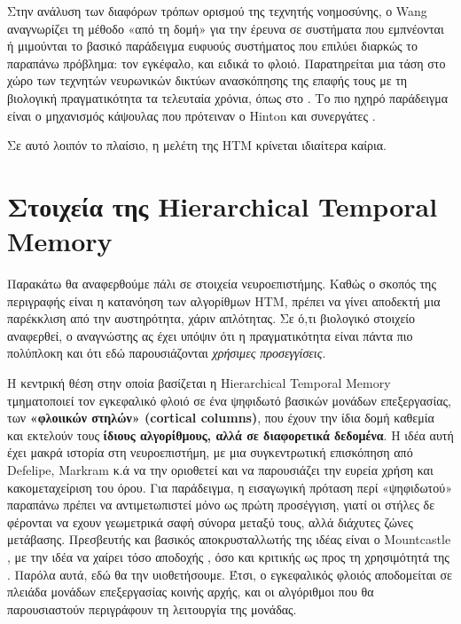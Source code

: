 	Στην ανάλυση των διαφόρων τρόπων ορισμού της τεχνητής νοημοσύνης, ο Wang \parencite{wangWhatYouMean2008} αναγνωρίζει τη μέθοδο
	«από τη δομή» για την έρευνα σε συστήματα που εμπνέονται ή μιμούνται
	το βασικό παράδειγμα ευφυούς συστήματος που επιλύει διαρκώς το παραπάνω πρόβλημα: τον εγκέφαλο, και ειδικά το φλοιό.
	Παρατηρείται μια τάση στο χώρο των τεχνητών νευρωνικών δικτύων ανασκόπησης της επαφής τους με τη βιολογική πραγματικότητα τα τελευταία χρόνια,
	όπως στο \cite{bengioBiologicallyPlausibleDeep2015}.
	Το πιο ηχηρό παράδειγμα είναι ο μηχανισμός κάψουλας που πρότειναν ο Hinton και συνεργάτες \parencite{sabourMatrixCapsulesEM2018,sabourDynamicRoutingCapsules2017}.
	\smallskip

	Σε αυτό λοιπόν το πλαίσιο, η μελέτη της HTM κρίνεται ιδιαίτερα καίρια.

\section{Στοιχεία της Hierarchical Temporal Memory}

	Παρακάτω θα αναφερθούμε πάλι σε στοιχεία νευροεπιστήμης.
	Καθώς ο σκοπός της περιγραφής είναι η κατανόηση των αλγορίθμων HTM, πρέπει να γίνει αποδεκτή μια παρέκκλιση από την αυστηρότητα, χάριν απλότητας.
	Σε ό,τι βιολογικό στοιχείο αναφερθεί, ο αναγνώστης ας έχει υπόψιν ότι η πραγματικότητα είναι πάντα πιο πολύπλοκη και ότι εδώ παρουσιάζονται \textit{χρήσιμες προσεγγίσεις}.

	Η κεντρική θέση στην οποία βασίζεται η Hierarchical Temporal Memory τμηματοποιεί τον εγκεφαλικό φλοιό σε ένα ψηφιδωτό βασικών μονάδων επεξεργασίας,
	των \textbf{«φλοιικών στηλών» (cortical columns)},
	που έχουν την ίδια δομή καθεμία και εκτελούν τους \textbf{ίδιους αλγορίθμους, αλλά σε διαφορετικά δεδομένα}.
	Η ιδέα αυτή έχει μακρά ιστορία στη νευροεπιστήμη, με μια συγκεντρωτική επισκόπηση από Defelipe, Markram κ.ά \cite{defelipeNeocorticalColumn2012}
	να την οριοθετεί και να παρουσιάζει την ευρεία χρήση και κακομεταχείριση του όρου.
	Για παράδειγμα, η εισαγωγική πρόταση περί «ψηφιδωτού» παραπάνω πρέπει να αντιμετωπιστεί μόνο ως πρώτη προσέγγιση,
	γιατί οι στήλες δε φέρονται να εχουν γεωμετρικά σαφή σύνορα μεταξύ τους, αλλά διάχυτες ζώνες μετάβασης.
	Πρεσβευτής και βασικός αποκρυσταλλωτής της ιδέας είναι ο Mountcastle \parencite{mountcastleColumnarOrganizationNeocortex1997},
	με την ιδέα να χαίρει τόσο αποδοχής \parencite{haueisLifeCorticalColumn2016}, όσο και κριτικής ως προς τη χρησιμότητά της \parencite{hortonCorticalColumnStructure2005}.
	Παρόλα αυτά, εδώ θα την υιοθετήσουμε.
	Έτσι, ο εγκεφαλικός φλοιός αποδομείται σε πλειάδα μονάδων επεξεργασίας κοινής αρχής, και οι αλγόριθμοι που θα παρουσιαστούν περιγράφουν τη λειτουργία της μονάδας.

